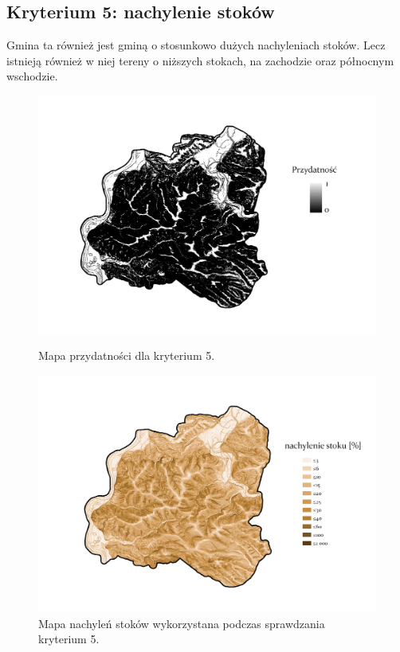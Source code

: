 \documentclass{article}
\begin{document}
\subsection{Kryterium 5: nachylenie stoków}
Gmina ta również jest gminą o stosunkowo dużych nachyleniach stoków. Lecz istnieją również w niej tereny o niższych stokach, na zachodzie oraz północnym wschodzie.

\begin{figure}[H]
    \begin{minipage}[t]{0.48\textwidth}
        \centering
        \includegraphics[width=\linewidth]{img/plesna-kryterium5-layout.jpg}
        \caption{Mapa przydatności dla kryterium 5.}
        \label{fig:kryterium5-layout}
    \end{minipage}
    \hfill
    \begin{minipage}[t]{0.48\textwidth}
        \centering
        \includegraphics[width=\linewidth]{img/plesna-kryterium5-stoki.jpg}
        \caption{Mapa nachyleń stoków wykorzystana podczas sprawdzania kryterium 5.}
        \label{fig:kryterium5-stoki}
    \end{minipage}
\end{figure}
\end{document}
